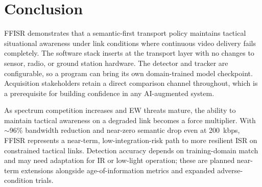 \documentclass[11pt]{article}
\begin{document}
\section{Conclusion}

FFISR demonstrates that a semantic-first transport policy maintains
tactical situational awareness under link conditions where continuous
video delivery fails completely. The software stack inserts at the
transport layer with no changes to sensor, radio, or ground station
hardware. The detector and tracker are configurable, so a program can
bring its own domain-trained model checkpoint. Acquisition stakeholders
retain a direct comparison channel throughout, which is a prerequisite
for building confidence in any AI-augmented system.

As spectrum competition increases and EW threats mature, the ability
to maintain tactical awareness on a degraded link becomes a force
multiplier. With $\sim$96\% bandwidth reduction and near-zero semantic
drop even at 200~kbps, FFISR represents a near-term, low-integration-risk
path to more resilient ISR on constrained tactical links. Detection
accuracy depends on training-domain match and may need adaptation for
IR or low-light operation; these are planned near-term extensions
alongside age-of-information metrics and expanded adverse-condition
trials.



\end{document}
